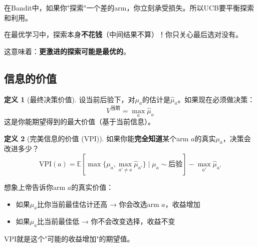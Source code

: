 \documentclass[11pt,a4paper]{article}
\theoremstyle{definition}
\newtheorem{definition}{定义}[section]
\begin{document}
\begin{plainwords}[为什么这和Bandit不同]
在Bandit中，如果你"探索"一个差的arm，你立刻承受损失。所以UCB要平衡探索和利用。

在最优学习中，探索本身\textbf{不花钱}（中间结果不算）！你只关心最后选对没有。

这意味着：\textbf{更激进的探索可能是最优的}。
\end{plainwords}

\subsection{信息的价值}

\begin{definition}[最终决策价值]
设当前后验下，对$\mu_a$的估计是$\hat{\mu}_a$。如果现在必须做决策：
\[
V^{\text{当前}} = \max_a \hat{\mu}_a
\]
这是你能期望得到的最大价值（基于当前信息）。
\end{definition}

\begin{definition}[完美信息的价值 (VPI)]
如果你能\textbf{完全知道}某个arm $a$的真实$\mu_a$，决策会改进多少？
\[
\text{VPI}(a) = \mathbb{E}\left[\max\{\mu_a, \max_{a' \neq a} \hat{\mu}_{a'}\} \mid \mu_a \sim \text{后验}\right] - \max_{a'} \hat{\mu}_{a'}
\]
\end{definition}

\begin{plainwords}[VPI在说什么]
想象上帝告诉你arm $a$的真实价值：
\begin{itemize}
    \item 如果$\mu_a$比你当前最佳估计还高 → 你会改选arm $a$，收益增加
    \item 如果$\mu_a$比当前最佳低 → 你不会改变选择，收益不变
\end{itemize}

VPI就是这个"可能的收益增加"的期望值。
\end{plainwords}
\end{document}
